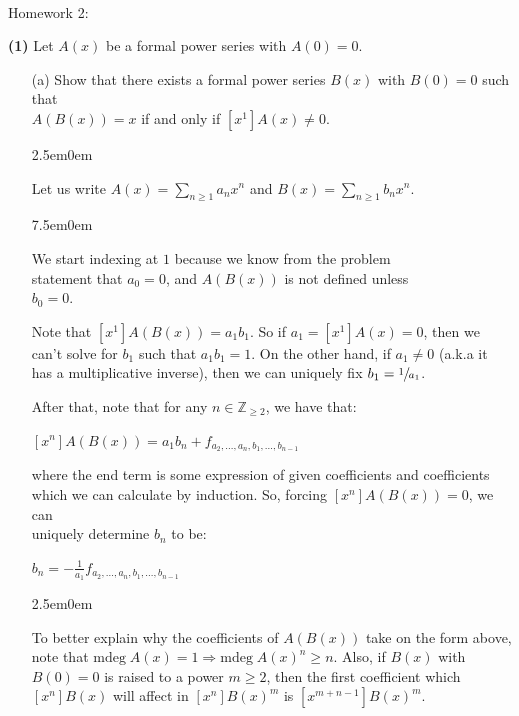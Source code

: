 \documentclass{book}
\newcommand{\exOne}{%
   \color{Purple}%
   \fontsize{13}{15}\selectfont%
}
\newcommand{\exPP}{%
   \color{RedViolet}%
   \fontsize{12}{14}\selectfont%
}
\newenvironment{myIndent}{%
   \begin{adjustwidth}{2.5em}{0em}%
}{%
   \end{adjustwidth}%
}
\newenvironment{myTindent}{%
   \begin{adjustwidth}{7.5em}{0em}%
}{%
   \end{adjustwidth}%
}
\newcommand{\blab}[1]{\textbf{#1}}
\newcommand{\mdeg}{\mathrm{mdeg}\phantom{.}}
\newcommand{\mySepTwo}[1][.]{%
   {\noindent\color{#1}{\rule{6.5in}{0.5mm}}}\\%
}
\newcommand{\retTwo}{\hfill\bigbreak}
\newcommand{\mHeader}[1]{{
   \color{Black}%
   \fontsize{20}{18}\selectfont%
   #1\retTwo
}}
\begin{document}
\mySepTwo

\newpage

\mHeader{Homework 2:}

\blab{(1)} Let $A(x)$ be a formal power series with $A(0) = 0$.
\begin{enumerate}
   \item[(a)] Show that there exists a formal power series $B(x)$ with $B(0) = 0$ such that\\ $A(B(x)) = x$ if and only if $[x^1]A(x) \neq 0$.
   
   \begin{myIndent}\exOne
      Let us write $A(x) = \sum\limits_{n \geq 1}a_nx^n$ and $B(x) = \sum\limits_{n \geq 1}b_nx^n$.\\ [-6pt]
      
      \begin{myTindent}\exPP
         We start indexing at $1$ because we know from the problem\\ statement that $a_0 = 0$, and $A(B(x))$ is not defined unless\\ $b_0 = 0$.\retTwo
      \end{myTindent}

      Note that $[x^1]A(B(x)) = a_1b_1$. So if $a_1 = [x^1]A(x) = 0$, then we can't solve for $b_1$ such that $a_1b_1 = 1$. On the other hand, if $a_1 \neq 0$ (a.k.a it has a multiplicative inverse), then we can uniquely fix $b_1 = \sfrac{1}{a_1}$.\retTwo

      After that, note that for any $n \in \mathbb{Z}_{\geq 2}$, we have that:
      
      {\centering $[x^n]A(B(x)) = a_1b_n + f_{a_2, \ldots, a_{n}, b_1,\ldots, b_{n-1}}$\par}
      
      where the end term is some expression of given coefficients and coefficients which we can calculate by induction. So, forcing $[x^n]A(B(x)) = 0$, we can\\ uniquely determine $b_n$ to be:

      {\centering $b_n = -\frac{1}{a_1}f_{a_2, \ldots, a_{n}, b_1,\ldots, b_{n-1}}$ \retTwo\par}

      \begin{myIndent}\exPP
         To better explain why the coefficients of $A(B(x))$ take on the form above,\\ note that $\mdeg A(x) = 1 \Longrightarrow \mdeg A(x)^n \geq n$. Also, if $B(x)$ with\\ $B(0) = 0$ is raised to a power $m \geq 2$, then the first coefficient which $[x^n]B(x)$ will affect in $[x^n]B(x)^m$ is $[x^{m + n - 1}]B(x)^m$.\retTwo
      \end{myIndent}


\end{myIndent}
\end{enumerate}
\end{document}
